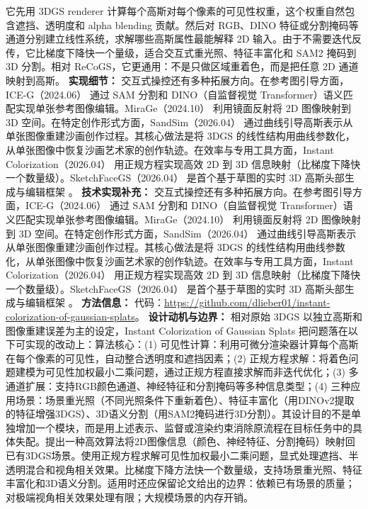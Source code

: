 它先用 3DGS renderer 计算每个高斯对每个像素的可见性权重，这个权重自然包含遮挡、透明度和 alpha blending 贡献。然后对 RGB、DINO 特征或分割掩码等通道分别建立线性系统，求解哪些高斯属性最能解释 2D 输入。由于不需要迭代反传，它比梯度下降快一个量级，适合交互式重光照、特征丰富化和 SAM2 掩码到 3D 分割。相对 ReCoGS，它更通用：不是只做区域重着色，而是把任意 2D 通道映射到高斯。
\textbf{实现细节：} 交互式操控还有多种拓展方向。在参考图引导方面，ICE-G（2024.06） 通过 SAM 分割和 DINO（自监督视觉 Transformer）语义匹配实现单张参考图像编辑。MiraGe（2024.10） 利用镜面反射将 2D 图像映射到 3D 空间。在特定创作形式方面，SandSim（2026.04） 通过曲线引导高斯表示从单张图像重建沙画创作过程。其核心做法是将 3DGS 的线性结构用曲线参数化，从单张图像中恢复沙画艺术家的创作轨迹。在效率与专用工具方面，Instant Colorization（2026.04） 用正规方程实现高效 2D 到 3D 信息映射（比梯度下降快一个数量级）。SketchFaceGS（2026.04） 是首个基于草图的实时 3D 高斯头部生成与编辑框架 。 %
\textbf{技术实现补充：} 交互式操控还有多种拓展方向。在参考图引导方面，ICE-G（2024.06） 通过 SAM 分割和 DINO（自监督视觉 Transformer）语义匹配实现单张参考图像编辑。MiraGe（2024.10） 利用镜面反射将 2D 图像映射到 3D 空间。在特定创作形式方面，SandSim（2026.04） 通过曲线引导高斯表示从单张图像重建沙画创作过程。其核心做法是将 3DGS 的线性结构用曲线参数化，从单张图像中恢复沙画艺术家的创作轨迹。在效率与专用工具方面，Instant Colorization（2026.04） 用正规方程实现高效 2D 到 3D 信息映射（比梯度下降快一个数量级）。SketchFaceGS（2026.04） 是首个基于草图的实时 3D 高斯头部生成与编辑框架 。 %
\textbf{方法信息：} 代码：\url{https://github.com/dlieber01/instant-colorization-of-gaussian-splats}。
\textbf{设计动机与边界：} 相对原始 3DGS 以独立高斯和图像重建误差为主的设定，Instant Colorization of Gaussian Splats 把问题落在以下可实现的改动上：算法核心：(1) 可见性计算：利用可微分渲染器计算每个高斯在每个像素的可见性，自动整合透明度和遮挡因素；(2) 正规方程求解：将着色问题建模为可见性加权最小二乘问题，通过正规方程直接求解而非迭代优化；(3) 多通道扩展：支持RGB颜色通道、神经特征和分割掩码等多种信息类型；(4) 三种应用场景：场景重光照（不同光照条件下重新着色）、特征丰富化（用DINOv2提取的特征增强3DGS）、3D语义分割（用SAM2掩码进行3D分割）。其设计目的不是单独增加一个模块，而是用上述表示、监督或渲染约束消除原流程在目标任务中的具体失配。提出一种高效算法将2D图像信息（颜色、神经特征、分割掩码）映射回已有3DGS场景。使用正规方程求解可见性加权最小二乘问题，显式处理遮挡、半透明混合和视角相关效果。比梯度下降方法快一个数量级，支持场景重光照、特征丰富化和3D语义分割。适用时还应保留论文给出的边界：依赖已有场景的质量；对极端视角相关效果处理有限；大规模场景的内存开销。

